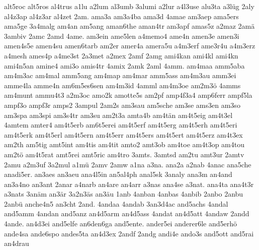 {    alt5roc
    alt5ros
    al4trus
    a1lu
    a2lum
    al3umb
    3alumi
    a2lur
    a4l3use
    alu3ta
    a3lüg
    2aly
    al4z3ap
    al4z3ar
    al4zet
    2am.
    ama3a
    am3a4ba
    ama3d
    4amae
    am3aep
    ama5ers
    ama5ge
    3a4malg
    am4an
    am5ang
    aman6the
    aman4tr
    am3apf
    amas5z
    a2maz
    2amä
    3ambiv
    2amc
    2amd
    4ame.
    am3ein
    ame5len
    a4memo4
    ame4n
    amen3e
    amen3i
    amen4s5e
    amen4su
    amen6tarb
    am2er
    amer4a
    amera5u
    a4m3erf
    ame3r4u
    a4m3erz
    a4mesh
    ames4p
    a4me3st
    2a3met
    a2mex
    2amf
    2amg
    ami4kan
    ami4kl
    ami4kn
    ami4n5an
    amine4
    ami3o
    amis4tr
    4amix
    2amk
    2aml
    4amm.
    am4maa
    amm5aba
    am4m3ac
    am4mal
    amm5ang
    am4map
    am4mar
    amm5ass
    am4m3au
    amm3ei
    amme4la
    amme4n
    am6m5es6sen
    am4m3id
    4amml
    am4m3oe
    am2m3ö
    4amms
    am4munt
    ammu4t3
    a2m3oc
    amo2k
    amotte5s
    am2pf
    amp4f3a4
    amp6ferr
    ampf5la
    ampf3o
    ampf3r
    amps2
    3ampul
    2am2s
    am3sau
    am5sche
    am3se
    ams3en
    am3so
    am3spa
    am3spi
    am3s4tr
    am3su
    am2t3a
    amta4b
    am4tän
    am4t5eig
    am4t3el
    4amtem
    amter4
    am4t5erb
    am6t5erei
    am4t5erf
    am4t5erg
    am4t5erh
    am4t5eri
    am4t5erk
    am4t5erl
    am4t5ern
    am4t5err
    am4t5ers
    am4t5ert
    am4t5erz
    am4t3ex
    am2th
    am5tig
    amt5int
    am4tis
    am4tit
    amto2
    amt3ob
    am4toe
    am4t3op
    am4tou
    am2tö
    am4t5rat
    amt5rei
    amt5ric
    am4tro
    3amts.
    3amtsd
    am2tu
    amt3ur
    2amtv
    2amu
    a2m3uf
    3a2mul
    a1mü
    2amv
    2amw
    a1na
    a3na.
    ana2a
    a2nab
    4anac
    ana5che
    anadi5er.
    an3aes
    an3aeu
    ana4l5in
    an5al4ph
    anal5sk
    3analy
    ana3m
    an4and
    an3a4no
    an3ant
    2anar
    a4narb
    an4are
    an4arr
    a3nas
    ana4se
    a3nat.
    ana4ta
    ana4t3r
    a3nats
    3anäm
    an3är
    3a2n3äs
    an3äu
    1anb
    4anban
    4anbas
    4anbib
    2anbo
    2anbu
    2anbü
    anche4n5
    an3cht
    2and.
    4andaa
    4andab
    3an3d4ac
    and5achs
    4andal
    and5amm
    4andan
    and5anz
    an4d5arm
    an4d5ass
    4andat
    an4d5att
    4andaw
    2andd
    4ande.
    an4d3ei
    and5elfe
    an6den6ga
    and5ente.
    ander5ei
    anderer6le
    and5erhö
    ande4sa
    ande6spo
    andes5ta
    an4d3ex
    2andf
    2andg
    andi4e
    ando3s
    and5ott
    and5rai
    an4drau
}
